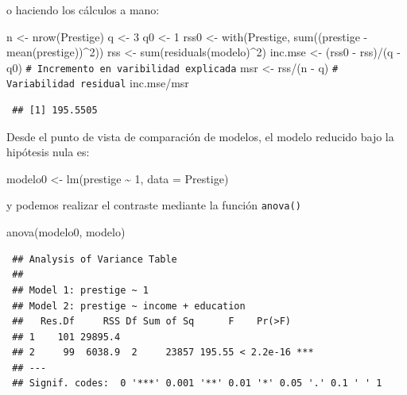 \documentclass[
]{book}
\newenvironment{Shaded}{\begin{snugshade}}{\end{snugshade}}
\newcommand{\AttributeTok}[1]{\textcolor[rgb]{0.77,0.63,0.00}{#1}}
\newcommand{\CommentTok}[1]{\textcolor[rgb]{0.56,0.35,0.01}{\textit{#1}}}
\newcommand{\DecValTok}[1]{\textcolor[rgb]{0.00,0.00,0.81}{#1}}
\newcommand{\FunctionTok}[1]{\textcolor[rgb]{0.00,0.00,0.00}{#1}}
\newcommand{\NormalTok}[1]{#1}
\newcommand{\OtherTok}[1]{\textcolor[rgb]{0.56,0.35,0.01}{#1}}
\newcommand{\SpecialCharTok}[1]{\textcolor[rgb]{0.00,0.00,0.00}{#1}}
\theoremstyle{break}
\theoremstyle{nonumberplain}
\renewcommand{\CommentTok}[1]{\textcolor[rgb]{0.41,0.41,0.41}{\texttt{#1}}}
\begin{document}
o haciendo los cálculos a mano:

\begin{Shaded}
\begin{Highlighting}[]
\NormalTok{n }\OtherTok{\textless{}{-}} \FunctionTok{nrow}\NormalTok{(Prestige)}
\NormalTok{q }\OtherTok{\textless{}{-}} \DecValTok{3}
\NormalTok{q0 }\OtherTok{\textless{}{-}} \DecValTok{1}
\NormalTok{rss0 }\OtherTok{\textless{}{-}} \FunctionTok{with}\NormalTok{(Prestige, }\FunctionTok{sum}\NormalTok{((prestige }\SpecialCharTok{{-}} \FunctionTok{mean}\NormalTok{(prestige))}\SpecialCharTok{\^{}}\DecValTok{2}\NormalTok{))}
\NormalTok{rss }\OtherTok{\textless{}{-}} \FunctionTok{sum}\NormalTok{(}\FunctionTok{residuals}\NormalTok{(modelo)}\SpecialCharTok{\^{}}\DecValTok{2}\NormalTok{)}
\NormalTok{inc.mse }\OtherTok{\textless{}{-}}\NormalTok{ (rss0 }\SpecialCharTok{{-}}\NormalTok{ rss)}\SpecialCharTok{/}\NormalTok{(q }\SpecialCharTok{{-}}\NormalTok{ q0)  }\CommentTok{\# Incremento en varibilidad explicada}
\NormalTok{msr }\OtherTok{\textless{}{-}}\NormalTok{  rss}\SpecialCharTok{/}\NormalTok{(n }\SpecialCharTok{{-}}\NormalTok{ q)               }\CommentTok{\# Variabilidad residual}
\NormalTok{inc.mse}\SpecialCharTok{/}\NormalTok{msr}
\end{Highlighting}
\end{Shaded}

\begin{verbatim}
 ## [1] 195.5505
\end{verbatim}

Desde el punto de vista de comparación de modelos, el modelo
reducido bajo la hipótesis nula es:

\begin{Shaded}
\begin{Highlighting}[]
\NormalTok{modelo0 }\OtherTok{\textless{}{-}} \FunctionTok{lm}\NormalTok{(prestige }\SpecialCharTok{\textasciitilde{}} \DecValTok{1}\NormalTok{, }\AttributeTok{data =}\NormalTok{ Prestige)}
\end{Highlighting}
\end{Shaded}

y podemos realizar el contraste mediante la función \texttt{anova()}

\begin{Shaded}
\begin{Highlighting}[]
\FunctionTok{anova}\NormalTok{(modelo0, modelo)}
\end{Highlighting}
\end{Shaded}

\begin{verbatim}
 ## Analysis of Variance Table
 ## 
 ## Model 1: prestige ~ 1
 ## Model 2: prestige ~ income + education
 ##   Res.Df     RSS Df Sum of Sq      F    Pr(>F)    
 ## 1    101 29895.4                                  
 ## 2     99  6038.9  2     23857 195.55 < 2.2e-16 ***
 ## ---
 ## Signif. codes:  0 '***' 0.001 '**' 0.01 '*' 0.05 '.' 0.1 ' ' 1
\end{verbatim}
\end{document}
